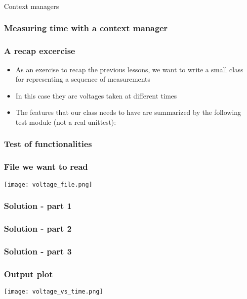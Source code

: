 \documentclass[9pt]{beamer}
\begin{document}
\begin{frame}
  \frametitle{}
  \centering \Large Context managers
\end{frame}


\begin{frame}
  \frametitle{Measuring time with a context manager}
  
\end{frame}


\begin{frame}
  \frametitle{A recap excercise}
  \begin{itemize}
    \item As an exercise to recap the previous lessons, we want to write a 
          small class for representing a sequence of measurements
    \item In this case they are voltages taken at different times
    \item The features that our class needs to have are summarized by the following
          test module (not a real unittest):
  \end{itemize}
  
\end{frame}


\begin{frame}
  \frametitle{Test of functionalities}
  
\end{frame}



\begin{frame}
  \frametitle{File we want to read}
  \centering
  \texttt{[image: voltage\_file.png]}
\end{frame}


\begin{frame}
  \frametitle{Solution - part 1}
  
\end{frame}


\begin{frame}
  \frametitle{Solution - part 2}
  
\end{frame}


\begin{frame}
  \frametitle{Solution - part 3}
  
\end{frame}


\begin{frame}
  \frametitle{Output plot}
  \centering
  \texttt{[image: voltage\_vs\_time.png]}
\end{frame}
\end{document}
